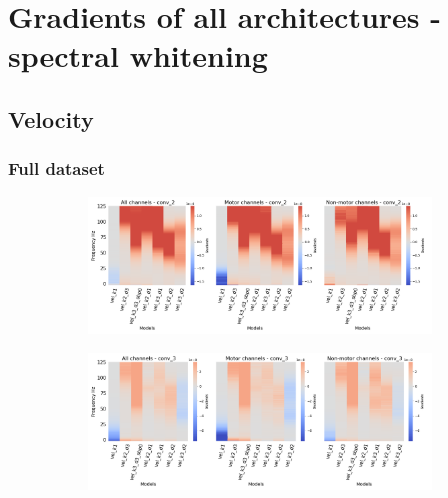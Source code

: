 \chapter{Gradients of all architectures - spectral whitening}\label{appendixD}

\section*{Velocity}\label{sec:velocity-appendixD}

\subsection*{Full dataset}\label{subsec:vel-full-dataset-appendixD}
\begin{figure}[!htpb]
\centering
\begin{subfigure}[b]{\textwidth}
   \includegraphics[width=0.85\linewidth]{img/appendix/D/conv-2/m/vel_model_gradients_all_kinds}
   \caption{}
   \label{fig:vel-pw-full-grads-conv-2}
\end{subfigure}

\begin{subfigure}[b]{\textwidth}
   \includegraphics[width=0.85\linewidth]{img/appendix/D/conv-3/m/vel_model_gradients_all_kinds}
   \caption{}
   \label{fig:vel-pw-full-grads-conv-3}
\end{subfigure}
\end{figure}
\clearpage   

